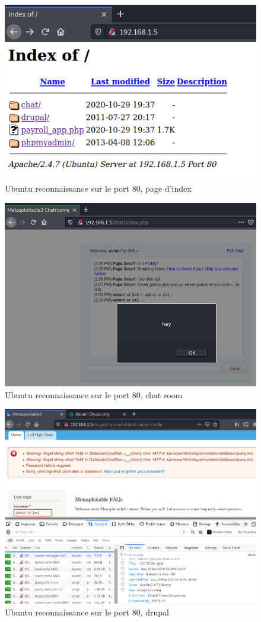 \documentclass[a4paper]{article}
\begin{document}
\begin{figure}[H]
    \centering
    \includegraphics[width=0.50\linewidth]{images/reconnaissance-17.PNG}
    \caption{Ubuntu reconnaissance sur le port 80, page d'index}
    \label{fig:reconnaissance17}
\end{figure}
\begin{figure}[H]
    \centering
    \includegraphics[width=0.90\linewidth]{images/reconnaissance-18.PNG}
    \caption{Ubuntu reconnaissance sur le port 80, chat room}
    \label{fig:reconnaissance18}
\end{figure}
\begin{figure}[H]
    \centering
    \includegraphics[width=0.90\linewidth]{images/reconnaissance-19.PNG}
    \caption{Ubuntu reconnaissance sur le port 80, drupal}
    \label{fig:reconnaissance19}
\end{figure}
\end{document}
